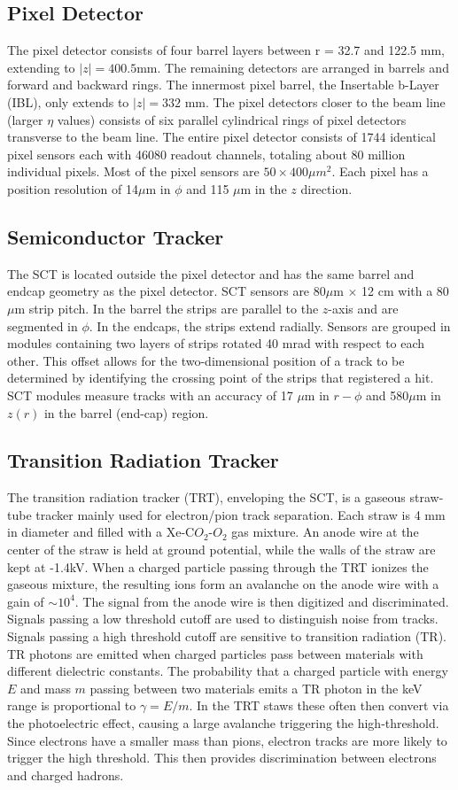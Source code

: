 \subsection{Pixel Detector}
The pixel detector consists of four barrel layers between r = 32.7 and 122.5 mm, extending to $|z|=400.5 $mm. The remaining detectors are arranged in barrels and forward and backward rings. The innermost pixel barrel, the Insertable b-Layer (IBL), only extends to $|z|=332$ mm. The pixel detectors closer to the beam line (larger $\eta$ values) consists of six parallel cylindrical rings of pixel detectors transverse to the beam line. The entire pixel detector consists of 1744 identical pixel sensors each with 46080 readout channels, totaling about 80 million individual pixels. Most of the pixel sensors are $50\times400\mu m^{2}$.  Each pixel has a position resolution of 14$\mu$m in $\phi$ and 115 $\mu$m in the $z$ direction.
\subsection{Semiconductor Tracker}
The SCT is located outside the pixel detector and has the same barrel and endcap geometry as the pixel detector. SCT sensors are 80$\mu$m $\times$ 12 cm with a 80$\mu$m strip pitch. In the barrel the strips are parallel to the $z$-axis and are segmented in $\phi$. In the endcaps, the strips extend radially. Sensors are grouped in modules containing two layers of strips rotated 40 mrad with respect to each other. This offset allows for the two-dimensional position of a track to be determined by identifying the crossing point of the strips that registered a hit. SCT modules measure tracks with an accuracy of 17 $\mu$m in $r-\phi$ and 580$\mu$m in $z(r)$ in the barrel (end-cap) region.
\subsection{Transition Radiation Tracker}
The transition radiation tracker (TRT), enveloping the SCT, is a gaseous straw-tube tracker mainly used for electron/pion track separation. Each straw is 4 mm in diameter and filled with a Xe-C$O_{2}$-$O_{2}$ gas mixture. An anode wire at the center of the straw is held at ground potential, while the walls of the straw are kept at -1.4kV. When a charged particle passing through the TRT ionizes the gaseous mixture, the resulting ions form an avalanche on the anode wire with a gain of $\sim 10^{4}$. The signal from the anode wire is then digitized and discriminated. Signals passing a low threshold cutoff are used to distinguish noise from tracks. Signals passing a high threshold cutoff are sensitive to transition radiation (TR). TR photons are emitted when charged particles pass between materials with different dielectric constants. The probability that a charged particle with energy $E$ and mass $m$ passing between two materials emits a TR photon in the keV range is proportional to $\gamma=E/m$. In the TRT staws these often then convert via the photoelectric effect, causing a large avalanche triggering the high-threshold. Since electrons have a smaller mass than pions, electron tracks are more likely to trigger the high threshold. This then provides discrimination between electrons and charged hadrons.

